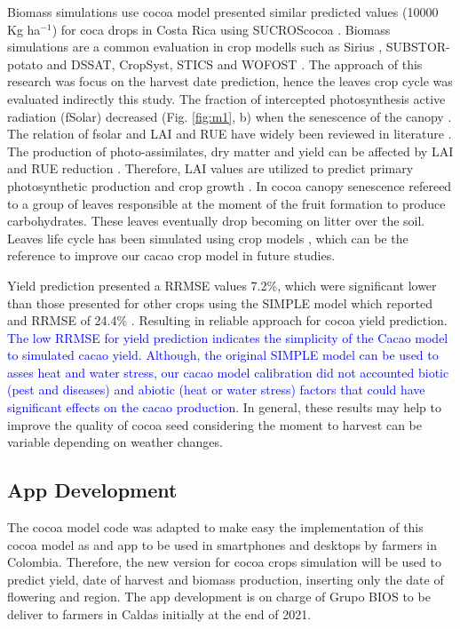 \documentclass[gene,journal,article,submit,moreauthors,pdftex]{Definitions/mdpi}
\begin{document}
Biomass simulations use cocoa model presented similar predicted values (10000 Kg ha$^{-1}$) for coca drops in Costa Rica using SUCROScocoa \citep{zuidema2005}. Biomass simulations are a common evaluation in crop modells such as Sirius \citep{Crout20142}, SUBSTOR-potato \citep{Raymundo2017} and  DSSAT, CropSyst, STICS and WOFOST \citep{Confalonieri2016}. The approach of this research was focus  on the harvest date prediction, hence the leaves crop cycle was evaluated indirectly this study. The fraction of intercepted photosynthesis active radiation (fSolar) decreased (Fig. \ref{fig:m1}, b) when the senescence of the canopy \citep{zuidema2005}. The relation of fsolar and LAI \citep{lahive2019, Danner2015, Soltani2012, Romero2017, Vina2011, Baracaldo2014} and RUE \citep{Fletcher2013RUE,Bonhomme2000} have widely been reviewed in literature . The  production of photo-assimilates, dry matter and yield can be affected by LAI and RUE reduction \citep{Deblonde2001, Fletcher2013RUE,Bonhomme2000, Romero2017}. Therefore, LAI values are utilized to predict primary photosynthetic production and crop growth \cite{Romero2017, Soltani2012, zuidema2005,Baracaldo2014}. In cocoa canopy senescence  refereed to  a group of leaves responsible  at the moment of the fruit formation to produce carbohydrates. These leaves eventually drop becoming on litter over the soil. Leaves life cycle has been simulated using crop models \citep{Crout2010, zuidema2005}, which can be the reference to improve our cacao crop model in future studies.   

Yield prediction presented a RRMSE values 7.2\%, which were significant lower than those  presented for other crops using the SIMPLE model which reported and RRMSE of 24.4\% \citep{Zao2019simple}. Resulting in reliable approach for cocoa yield prediction.  \textcolor{blue}{The low RRMSE for yield prediction indicates the simplicity of the Cacao model to simulated cacao  yield. Although, the original SIMPLE model can be used to asses heat and water stress, our cacao model calibration  did  not accounted biotic (pest and diseases) and abiotic (heat or water stress) factors that could have significant effects on the cacao production.} In general, these results may help to improve the quality of cocoa seed considering the moment to harvest can be variable depending on weather changes. 


\subsection{App Development}
The cocoa model code was adapted to make easy the implementation of this cocoa model as and app to be used in smartphones and desktops by farmers in Colombia. Therefore, the new version for cocoa crops simulation will be used to predict yield, date of harvest and biomass production, inserting only the date of flowering and region. The app development is on charge of Grupo BIOS to be deliver to farmers in Caldas initially at the end of 2021. 
\end{document}
